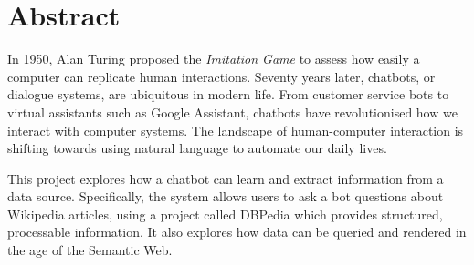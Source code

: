 \chapter*{Abstract}
In 1950, Alan Turing proposed the {\it Imitation Game} to assess how easily a computer can replicate human interactions. Seventy years later, chatbots, or dialogue systems, are ubiquitous in modern life. From customer service bots to virtual assistants such as Google Assistant, chatbots have revolutionised how we interact with computer systems. The landscape of human-computer interaction is shifting towards using natural language to automate our daily lives.

This project explores how a chatbot can learn and extract information from a data source. Specifically, the system allows users to ask a bot questions about Wikipedia articles, using a project called DBPedia which provides structured, processable information. It also explores how data can be queried and rendered in the age of the Semantic Web.


